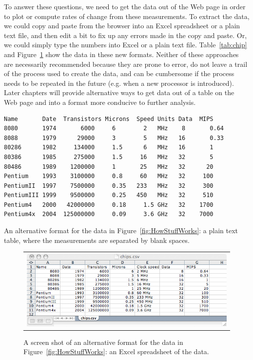 To answer these questions, we need to get the data out of the Web page
in order to plot or compute rates of change from these measurements.
To extract the data, we could copy and paste from the browser into an
Excel spreadsheet or a plain text file, and then edit a bit to fix up
any errors made in the copy and paste.  Or, we could simply type the
numbers into Excel or a plain text file.  Table~\ref{tab:chip} and
Figure~\ref{fig:csvExcel} show the data in these new formats.  Neither
of these approaches are necessarily recommended because they are prone
to error, do not leave a trail of the process used to create the data,
and can be cumbersome if the process needs to be repeated in the
future (e.g. when a new processor is introduced).  Later chapters will
provide alternative ways to get data out of a table on the Web page
and into a format more conducive to further analysis.

\begin{table}
{\footnotesize{
\begin{verbatim}
Name       Date  Transistors Microns  Speed Units Data 	MIPS
8080       1974       6000     6        2   MHz    8       0.64
8088       1979      29000     3        5   MHz   16       0.33
80286      1982     134000     1.5      6   MHz   16       1
80386      1985     275000     1.5     16   MHz   32       5
80486      1989    1200000     1       25   MHz   32      20 
Pentium    1993    3100000     0.8     60   MHz   32     100
PentiumII  1997    7500000     0.35   233   MHz   32     300
PentiumIII 1999    9500000     0.25   450   MHz   32     510
Pentium4   2000   42000000     0.18     1.5 GHz   32    1700 
Pentium4x  2004  125000000     0.09     3.6 GHz   32    7000
\end{verbatim}
}}
  \caption{An alternative format for the data in Figure~\ref{fig:HowStuffWorks}: a plain text table, where the measurements are separated by blank spaces.}\label{tab:chip}
\end{table}

\begin{figure}
\begin{center}
\begin{tabular}{c}
\includegraphics[width=5in]{computerIntro/images/excelScreenshot.png}
\end{tabular}
\caption{A screen shot of an alternative format for the data in
  Figure~\ref{fig:HowStuffWorks}: an Excel spreadsheet of the data.}
\label{fig:csvExcel}
\end{center}
\end{figure}


